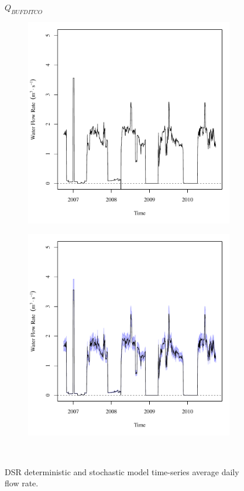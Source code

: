 \subfiguremid
\begin{landscape}
	\begin{figure}
		\centering
		$ Q_{BUFDITCO} $
		\begin{subfigure}{0.7\textwidth}
			\centering
			\includegraphics[width=\tableCustomSize]{"Figures/Results_DSR/Deterministic/Q BUF"}
		\end{subfigure}%
		\begin{subfigure}{0.7\textwidth}
			\centering
			\includegraphics[width=\tableCustomSize]{"Figures/Results_DSR/Stochastic/Q BUF"}
		\end{subfigure}\\
		\caption{DSR deterministic and stochastic model time-series average daily flow rate.}
	\end{figure}
\end{landscape}
